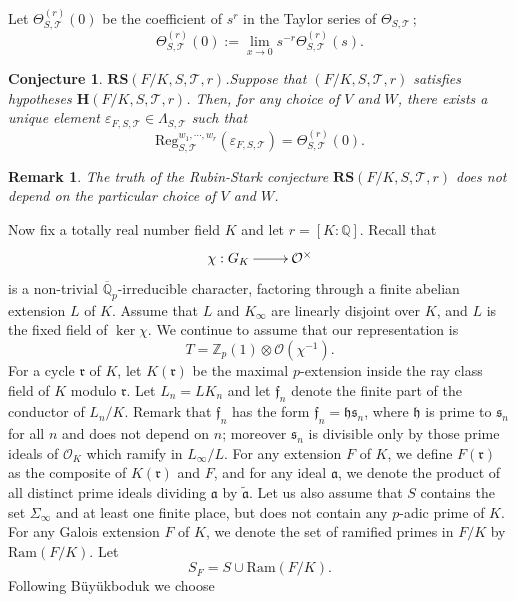 \documentclass[reqno]{amsart}
\newcounter{dummy} \numberwithin{dummy}{section}
\newtheorem{rem}[dummy]{Remark}
\newtheorem{conj}{Conjecture}
\begin{document}
Let $\Theta_{S,\mathcal{T}}^{(r)}(0)$ be the coefficient of $s^{r}$
in the Taylor series of $\Theta_{S,\mathcal{T}}$\,;
$$
\Theta_{S,\mathcal{T}}^{(r)}(0):=\displaystyle{\lim_{x\rightarrow
0}} s^{-r}\Theta_{S,\mathcal{T}}^{(r)}(s).
$$
\begin{conj} $\mathbf{RS}(F/K,S,\mathcal{T},r)$.\;Suppose that $(F/K,S,\mathcal{T},r)$ satisfies hypotheses
$\mathbf{H}(F/K,S,\mathcal{T},r)$. Then, for any choice of $V$ and
$W$, there exists a unique element
$\varepsilon_{F,S,\mathcal{T}}\in\Lambda_{S,\mathcal{T}}$
 such that
 $$
\mathrm{Reg}_{S,\mathcal{T}}^{w_{1},\cdots,w_{r}}(\varepsilon_{F,S,\mathcal{T}})=\Theta_{S,\mathcal{T}}^{(r)}(0).
$$
\end{conj}
\begin{rem}
The truth of the Rubin-Stark conjecture
$\mathbf{RS}(F/K,S,\mathcal{T},r)$ does not depend on the particular
choice of $V$ and $W$.
\end{rem}
\vskip7pt Now fix a totally real number field $K$ and let
$r=[K:\mathbb{Q}]$. Recall that
$$
\xymatrix@=2pc{ \chi : G_{K}\ar[r]& \mathcal{O}^{\times}}
$$
is a non-trivial $\overline{\mathbb{Q}}_{p}$-irreducible character,
factoring through a finite abelian  extension $L$ of $K$. Assume
that $L$ and $K_{\infty}$ are linearly disjoint over $K$, and $L$ is
the fixed field of $\ker\chi$. We continue to assume that our
representation is
$$
T=\mathbb{Z}_{p}(1)\otimes \mathcal{O}(\chi^{-1}).
$$
\vskip 6pt
 For a cycle $\mathfrak{r}$ of $K$, let $K(\mathfrak{r})$ be the
maximal $p$-extension inside the ray class field of $K$ modulo
$\mathfrak{r}$. Let $L_{n}=LK_{n}$ and let $\mathfrak{f}_{n}$ denote
the finite part of the conductor of $L_{n}/K$. Remark that
$\mathfrak{f}_{n}$ has the form
$\mathfrak{f}_{n}=\mathfrak{h}\mathfrak{s}_{n}$, where
$\mathfrak{h}$ is prime to $\mathfrak{s}_{n}$ for all $n$ and does
not depend on $n$; moreover $\mathfrak{s}_{n}$ is divisible only by
those prime ideals of $\mathcal{O}_{K}$ which ramify in
$L_{\infty}/L$. For any extension $F$ of $K$, we define
$F(\mathfrak{r})$ as the composite of $K(\mathfrak{r})$ and $F$, and
for any ideal $\mathfrak{a}$, we denote the product of all distinct
prime ideals dividing $\mathfrak{a}$ by $\widetilde{\mathfrak{a}}$.
Let us also assume that $S$ contains the set $\Sigma_{\infty}$ and
at least one finite place, but does not contain any $p$-adic prime
of $K$. For any Galois extension $F$ of $K$, we denote the set of
ramified primes in $F/K$ by $\mathrm{Ram}(F/K)$. Let
$$
S_{F}=S\cup\mathrm{Ram}(F/K).
$$
Following B\"{u}y\"{u}kboduk \cite{Kazim109} we choose
\end{document}
